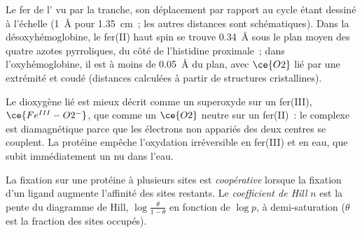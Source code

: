 \begin{omfigure}

{\small Le fer de l' vu par la tranche, son déplacement par rapport au
cycle étant dessiné à l'échelle (1~\AA{} pour 1.35~cm~; les autres distances sont schématiques). Dans la désoxyhémoglobine, le fer(II) haut spin se trouve
\qty{0.34}{\angstrom} sous le plan moyen des quatre azotes pyrroliques, du
côté de l'histidine proximale~; dans l'oxyhémoglobine, il est à moins de \qty{0.05}{\angstrom} du plan, avec $\ce{O2}$
lié par une extrémité et coudé (distances calculées à partir de structures
cristallines).}
\end{omfigure}

Le dioxygène lié est mieux décrit comme un superoxyde sur un fer(III), $\ce{Fe^{III}-O2^-}$, que comme
un $\ce{O2}$ neutre sur un fer(II)~: le complexe est diamagnétique parce que les électrons non
appariés des deux centres se couplent. La protéine empêche l'oxydation
irréversible en fer(III) et en eau, que subit immédiatement un  nu dans
l'eau.

\begin{definition}\label{def:b3:bioinorganic:cooperativity}
La fixation sur une protéine à plusieurs sites est \emph{coopérative}
lorsque la fixation d'un ligand augmente l'affinité des sites restants. Le
\emph{coefficient de Hill} $n$ est la pente du
diagramme de Hill, $\log\frac{\theta}{1 - \theta}$ en fonction de $\log p$, à demi-saturation ($\theta$ est la fraction des sites
occupés).
\end{definition}


